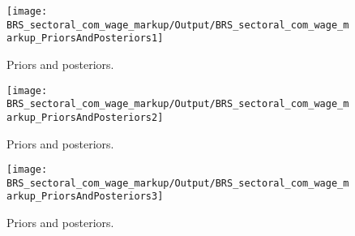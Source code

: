  
\begin{figure}[H]
\centering
\texttt{[image: BRS\_sectoral\_com\_wage\_markup/Output/BRS\_sectoral\_com\_wage\_markup\_PriorsAndPosteriors1]}
\caption{Priors and posteriors.}\label{Fig:PriorsAndPosteriors:1}
\end{figure}
 
\begin{figure}[H]
\centering
\texttt{[image: BRS\_sectoral\_com\_wage\_markup/Output/BRS\_sectoral\_com\_wage\_markup\_PriorsAndPosteriors2]}
\caption{Priors and posteriors.}\label{Fig:PriorsAndPosteriors:2}
\end{figure}
 
\begin{figure}[H]
\centering
\texttt{[image: BRS\_sectoral\_com\_wage\_markup/Output/BRS\_sectoral\_com\_wage\_markup\_PriorsAndPosteriors3]}
\caption{Priors and posteriors.}\label{Fig:PriorsAndPosteriors:3}
\end{figure}
 
